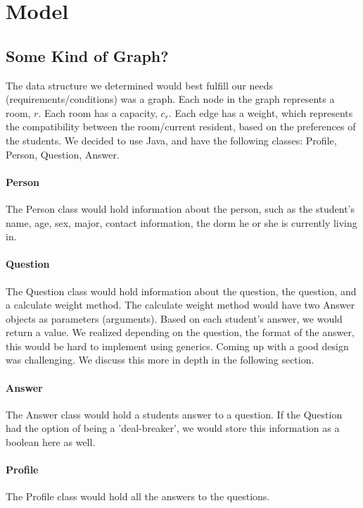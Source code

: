 \documentclass[12pt]{article}
\begin{document}
\section{Model}

\subsection{Some Kind of Graph?}
The data structure we determined would best fulfill our needs (requirements/conditions) was a graph. Each node in the graph represents a room, $r$. Each room has a capacity, $c_r$. Each edge has a weight, which represents the compatibility between the room/current resident, based on the preferences of the students. We decided to use Java, and have the following classes: Profile, Person, Question, Answer.
\paragraph{Person} The Person class would hold information about the person, such as the student's name, age, sex, major, contact information, the dorm he or she is currently living in.
\paragraph{Question}
The Question class would hold information about the question, the question, and a calculate weight method. The calculate weight method would have two Answer objects as parameters (arguments). Based on each student's answer, we would return a value. We realized depending on the question, the format of the answer, this would be hard to implement using generics. Coming up with a good design was challenging. We discuss this more in depth in the following section. 

\paragraph{Answer} The Answer class would hold a students answer to a question. If the Question had the option of being a 'deal-breaker', we would store this information as a boolean here as well.
\paragraph{Profile} The Profile class would hold all the answers to the questions.  
\end{document}
